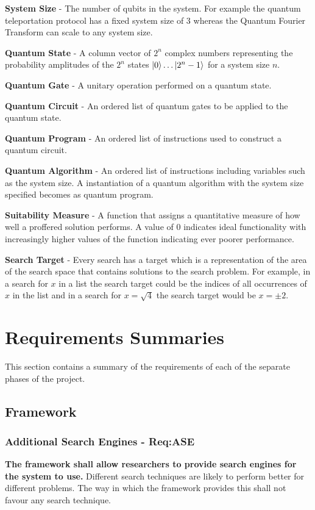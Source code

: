 \textbf{System Size} - The number of qubits in the system. For example the quantum teleportation protocol has a fixed system size of 3 whereas the Quantum Fourier Transform can scale to any system size.

\textbf{Quantum State} - A column vector of $2^n$ complex numbers representing the probability amplitudes of the $2^n$ states $\left\vert{0}\right\rangle\dots\left\vert{2^n-1}\right\rangle$ for a system size $n$.

\textbf{Quantum Gate} - A unitary operation performed on a quantum state.

\textbf{Quantum Circuit} - An ordered list of quantum gates to be applied to the quantum state.

\textbf{Quantum Program} - An ordered list of instructions used to construct a quantum circuit.

\textbf{Quantum Algorithm} - An ordered list of instructions including variables such as the system size.
A instantiation of a quantum algorithm with the system size specified becomes as quantum program.

\textbf{Suitability Measure} - A function that assigns a quantitative measure of how well a proffered solution performs.
A value of $0$ indicates ideal functionality with increasingly higher values of the function indicating ever poorer performance.

\textbf{Search Target} - Every search has a target which is a representation of the area of the search space that contains solutions to the search problem.
For example, in a search for $x$ in a list the search target could be the indices of all occurrences of $x$ in the list and in a search for $x=\sqrt{4}$ the search target would be $x=\pm2$.

\section{Requirements Summaries}
This section contains a summary of the requirements of each of the separate phases of the project.

\subsection{Framework}
\subsubsection{Additional Search Engines - Req:ASE}
\label{sec:reqase}
\textbf{The framework shall allow researchers to provide search engines for the system to use.}
Different search techniques are likely to perform better for different problems.
The way in which the framework provides this shall not favour any search technique.

